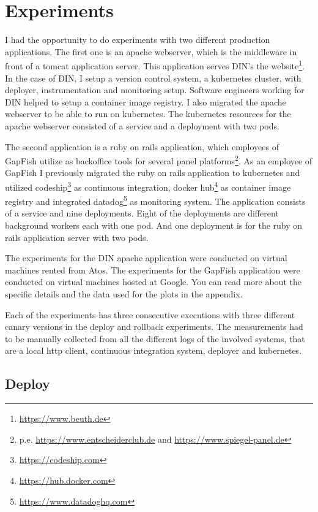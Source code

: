 \section{Experiments}

I had the opportunity to do experiments with two different production applications. The
first one is an apache webserver, which is the middleware in front of a tomcat application
server. This application serves DIN's the website\footnote{\url{https://www.beuth.de}}. In
the case of DIN, I setup a version control system, a kubernetes cluster, with deployer,
instrumentation and monitoring setup. Software engineers working for DIN helped to setup a
container image registry. I also migrated the apache webserver to be able to run on
kubernetes. The kubernetes resources for the apache webserver consisted of a service and a
deployment with two pods.

The second application is a ruby on rails application, which employees of GapFish utilize
as backoffice tools for several panel
platforms\footnote{p.e. \url{https://www.entscheiderclub.de} and
  \url{https://www.spiegel-panel.de}}. As an employee of GapFish I previously migrated the
ruby on rails application to kubernetes and utilized
codeship\footnote{\url{https://codeship.com}} as continuous integration, docker
hub\footnote{\url{https://hub.docker.com}} as container image registry and integrated
datadog\footnote{\url{https://www.datadoghq.com}} as monitoring system. The application
consists of a service and nine deployments. Eight of the deployments are different
background workers each with one pod. And one deployment is for the ruby on rails
application server with two pods.

The experiments for the DIN apache application were conducted on virtual machines rented
from Atos. The experiments for the GapFish application were conducted on virtual machines
hosted at Google. You can read more about the specific details and the data used for the
plots in the appendix.

Each of the experiments has three consecutive executions with three different canary
versions in the deploy and rollback experiments. The measurements had to be manually
collected from all the different logs of the involved systems, that are a local http
client, continuous integration system, deployer and kubernetes.

\subsection{Deploy}

